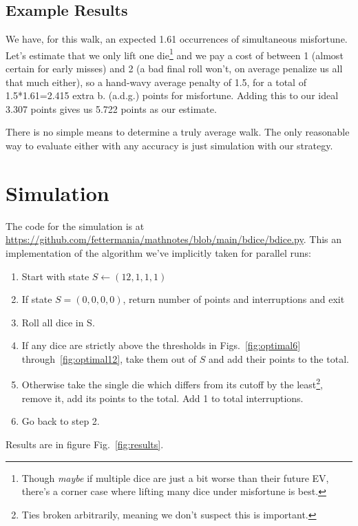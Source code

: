 \documentclass[11pt, oneside]{article} 	%
\begin{document}
\subsection{Example Results}

We have, for this walk, an expected 1.61 occurrences of simultaneous misfortune. Let's estimate that we only lift one die\footnote{Though \emph{maybe} if multiple dice are just a bit worse than their future EV, there's a corner case where lifting many dice under misfortune is best.} and we pay a cost of between 1 (almost certain for early misses) and 2 (a bad final roll won't, on average penalize us all that much either), so a hand-wavy average penalty of 1.5, for a total of 1.5*1.61=2.415 extra b. (a.d.g.) points for misfortune. Adding this to our ideal 3.307 points gives us 5.722 points as our estimate.

There is no simple means to determine a truly average walk.   The only reasonable way to evaluate either with any accuracy is just simulation with our strategy. 

\section{Simulation} \label {section:simulation}

The code for the simulation is at \url{https://github.com/fettermania/mathnotes/blob/main/bdice/bdice.py}.  This an implementation of the algorithm we've implicitly taken for parallel runs:
\begin{enumerate}
\item Start with state $S \leftarrow (12,1,1,1)$
\item If state $S = (0, 0, 0, 0)$, return number of points and interruptions and exit
\item Roll all dice in S.
\item If any dice are strictly above the thresholds in Figs.~\ref{fig:optimal6} through~\ref{fig:optimal12}, take them out of $S$ and add their points to the total.
\item Otherwise take the single die which differs from its cutoff by the least\footnote{Ties broken arbitrarily, meaning we don't suspect this is important.}, remove it, add its points to the total.  Add 1 to total interruptions.
\item Go back to step 2.
\end{enumerate}

Results are in figure Fig.~\ref{fig:results}.
\end{document}

